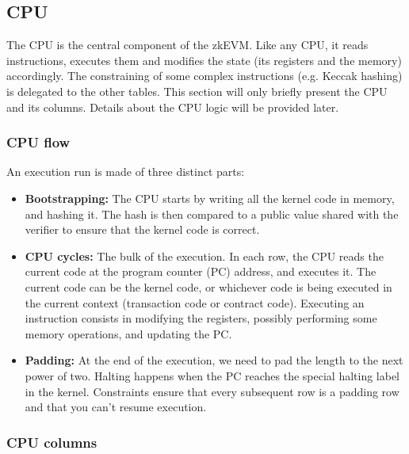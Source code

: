 \subsection{CPU}
\label{cpu}

The CPU is the central component of the zkEVM. Like any CPU, it reads instructions, executes them and modifies the state (its registers and the memory)
accordingly. The constraining of some complex instructions (e.g. Keccak hashing) is delegated to the other tables.
This section will only briefly present the CPU and its columns. Details about the CPU logic will be provided later.

\subsubsection{CPU flow}

An execution run is made of three distinct parts:
\begin{itemize}
    \item \textbf{Bootstrapping:} The CPU starts by writing all the kernel code in memory, and hashing it. The hash is then compared to a public value shared with
the verifier to ensure that the kernel code is correct.
    \item \textbf{CPU cycles:} The bulk of the execution. In each row, the CPU reads the current code at the program counter (PC) address, and executes it. The current code can be the kernel code,
or whichever code is being executed in the current context (transaction code or contract code). Executing an instruction consists in modifying the registers, possibly
performing some memory operations, and updating the PC.
\item \textbf{Padding:} At the end of the execution, we need to pad the length to the next power of two. Halting happens when the PC reaches the special halting label
in the kernel. Constraints ensure that every subsequent row is a padding row and that you can't resume execution.
\end{itemize}

\subsubsection{CPU columns}

